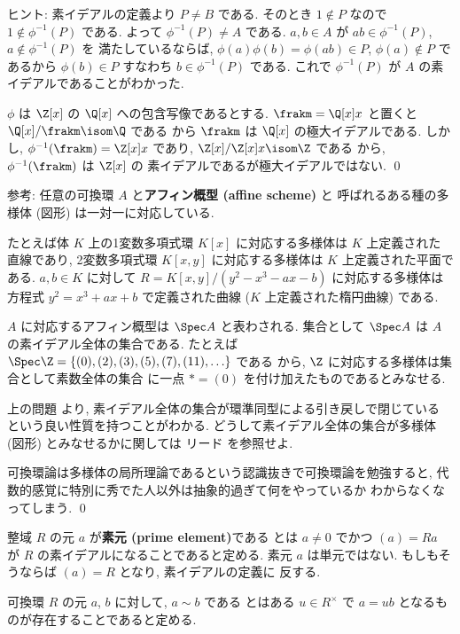 \documentclass[12pt,twoside]{jarticle}
\begin{document}
\noindent
ヒント: 素イデアルの定義より $P\ne B$ である. 
そのとき $1\not\in P$ なので $1\not\in \phi^{-1}(P)$ である. 
よって $\phi^{-1}(P)\ne A$ である.
$a,b\in A$ が $ab\in\phi^{-1}(P)$, $a\not\in\phi^{-1}(P)$ を
満たしているならば, $\phi(a)\phi(b)=\phi(ab)\in P$, $\phi(a)\not\in P$ 
であるから $\phi(b)\in P$ すなわち $b\in\phi^{-1}(P)$ である.
これで $\phi^{-1}(P)$ が $A$ の素イデアルであることがわかった.

$\phi$ は $\Z[x]$ の $\Q[x]$ への包含写像であるとする.
$\frakm=\Q[x]x$ と置くと $\Q[x]/\frakm\isom\Q$ である
から $\frakm$ は $\Q[x]$ の極大イデアルである. 
しかし, $\phi^{-1}(\frakm)=\Z[x]x$ であり, $\Z[x]/\Z[x]x\isom\Z$ である
から, $\phi^{-1}(\frakm)$ は $\Z[x]$ の
素イデアルであるが極大イデアルではない.
\qed

\medskip
\noindent
参考: 任意の可換環 $A$ と{\bf アフィン概型 (affine scheme)} と
呼ばれるある種の多様体 (図形) は一対一に対応している.  

たとえば体 $K$ 上の1変数多項式環 $K[x]$ に対応する多様体は $K$ 上定義された
直線であり, 2変数多項式環 $K[x,y]$ に対応する多様体は $K$ 上定義された平面で
ある.  $a,b\in K$ に対して $R=K[x,y]/(y^2-x^3-ax-b)$ に対応する多様体は
方程式 $y^2=x^3+ax+b$ で定義された曲線 ($K$ 上定義された楕円曲線) である.

$A$ に対応するアフィン概型は $\Spec A$ と表わされる.
集合として $\Spec A$ は $A$ の素イデアル全体の集合である.
たとえば $\Spec\Z=\{(0),(2),(3),(5),(7),(11),\ldots\}$ である
から, $\Z$ に対応する多様体は集合として素数全体の集合
に一点 $\ast=(0)$ を付け加えたものであるとみなせる.

上の問題  より, 
素イデアル全体の集合が環準同型による引き戻しで閉じている
という良い性質を持つことがわかる.
どうして素イデアル全体の集合が多様体 (図形) とみなせるかに関しては
リード \cite{reid} を参照せよ.

可換環論は多様体の局所理論であるという認識抜きで可換環論を勉強すると, 
代数的感覚に特別に秀でた人以外は抽象的過ぎて何をやっているか
わからなくなってしまう.
\qed

\bigskip

整域 $R$ の元 $a$ が{\bf 素元 (prime element)}である
とは $a\ne 0$ でかつ $(a)=Ra$ が $R$ の素イデアルになることであると定める.
素元 $a$ は単元ではない. もしもそうならば $(a)=R$ となり, 素イデアルの定義に
反する.

可換環 $R$ の元 $a$, $b$ に対して, $a\sim b$ である
とはある $u\in R^\times$ で $a=ub$ となるものが存在することであると定める.
\end{document}
